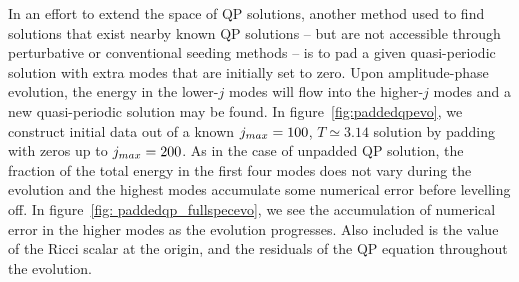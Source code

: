\documentclass[../PhD.tex]{subfiles}
\begin{document}
In an effort to extend the space of QP solutions, another method used to find solutions that exist nearby known QP solutions -- but are not accessible through perturbative or conventional seeding methods -- is to pad a given quasi-periodic solution with extra modes that are initially set to zero. Upon amplitude-phase evolution, the energy in the lower-$j$ modes will flow into the higher-$j$ modes and a new quasi-periodic solution may be found. In figure~\ref{fig:paddedqpevo}, we construct initial data out of a known $j_{max} = 100$, $T \simeq 3.14$ solution by padding with zeros up to $j_{max} = 200$. As in the case of unpadded QP solution, the fraction of the total energy in the first four modes does not vary during the evolution and the highest modes accumulate some numerical error before levelling off. In figure~\ref{fig: paddedqp_fullspecevo}, we see the accumulation of numerical error in the higher modes as the evolution progresses. Also included is the value of the Ricci scalar at the origin, and the residuals of the QP equation throughout the evolution.
\end{document}
